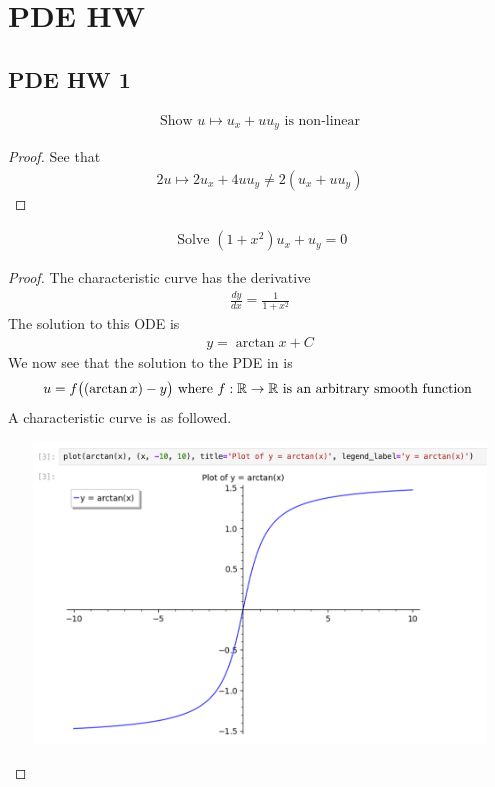 \documentclass{report}
\begin{document}
\chapter{PDE HW}
\section{PDE HW 1}
\begin{theorem}
\begin{align*}
\text{ Show }u\mapsto u_x+uu_y\text{ is non-linear }
\end{align*}
\end{theorem}
\begin{proof}
See that 
\begin{align}
\label{he1}
2u\mapsto 2u_x+4uu_y\neq 2(u_x+uu_y)
\end{align}
\end{proof}
\begin{theorem}
\begin{align*}
\text{ Solve }(1+x^2)u_x+u_y=0
\end{align*}
\end{theorem}
\begin{proof}
The characteristic curve has the derivative 
\begin{align*}
\frac{dy}{dx}=\frac{1}{1+x^2}
\end{align*}
The solution to this ODE is 
\begin{align*}
y=\arctan x + C
\end{align*}
We now see that the solution to the PDE in  is 
\begin{align*}
u=f\big((\arctan x)-y\big)\text{ where }f:\mathbb{R}\rightarrow \mathbb{R}\text{ is an arbitrary smooth function }
\end{align*}
A characteristic curve is as followed.
\begin{center}
   \begin{minipage}{0.9\linewidth}  
       \centering       
\includegraphics[height=8cm,width=15cm]{pdehw1}
   \end{minipage}
\end{center}
\end{proof}
\end{document}
